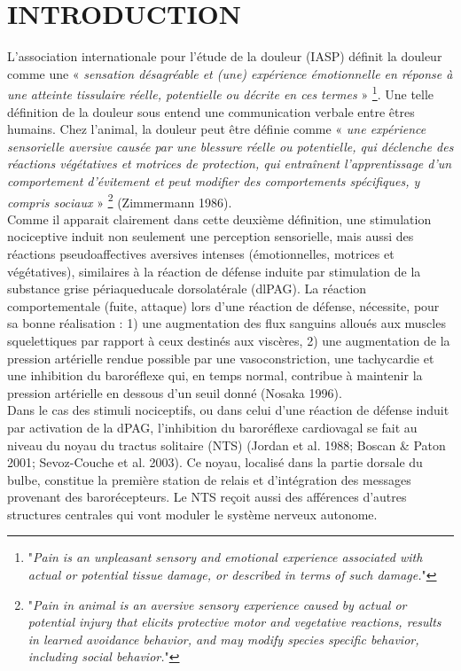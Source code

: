 \documentclass[a4paper,12pt,twoside]{report}
\begin{document}
\cleardoublepage

\setlength{\parindent}{1cm}

\section{INTRODUCTION}

L’association internationale pour l’étude de la douleur (IASP) définit la douleur comme une « \textit{sensation désagréable et (une) expérience émotionnelle en réponse à une atteinte tissulaire réelle, potentielle ou décrite en ces termes} »
\footnote{"\textit{Pain is an unpleasant sensory and emotional experience associated with actual or potential tissue damage, or described in terms of such damage.}"}. 
Une telle définition de la douleur sous entend une communication verbale entre êtres humains. Chez l’animal, la douleur peut être définie comme « \textit{une expérience sensorielle aversive causée par une blessure réelle ou potentielle, qui déclenche des réactions végétatives et motrices de protection, qui entraînent l’apprentissage d’un comportement d’évitement et peut modifier des comportements spécifiques, y compris sociaux} »
\footnote{"\textit{Pain in animal is an aversive sensory experience caused by actual or potential injury that elicits protective motor and vegetative reactions, results in learned avoidance behavior, and may modify species specific behavior, including social behavior.}"} 
(Zimmermann 1986).\\
Comme il apparait clairement dans cette deuxième définition, une stimulation nociceptive induit non seulement une perception sensorielle, mais aussi des réactions pseudoaffectives aversives intenses (émotionnelles, motrices et végétatives), similaires à la réaction de défense induite par stimulation de la substance grise périaqueducale dorsolatérale (dlPAG). La réaction comportementale (fuite, attaque) lors d’une réaction de défense, nécessite, pour sa bonne réalisation : 1) une augmentation des flux sanguins alloués aux muscles squelettiques par rapport à ceux destinés aux viscères, 2) une augmentation de la pression artérielle rendue possible par une vasoconstriction, une tachycardie et une inhibition du baroréflexe qui, en temps normal, contribue à maintenir la pression artérielle en dessous d’un seuil donné (Nosaka 1996).\\
Dans le cas des stimuli nociceptifs, ou dans celui d’une réaction de défense induit par activation de la dPAG, l’inhibition du baroréflexe cardiovagal se fait au niveau du noyau du tractus solitaire (NTS) (Jordan et al. 1988; Boscan \& Paton 2001; Sevoz-Couche et al. 2003). Ce noyau, localisé dans la partie dorsale du bulbe, constitue la première station de relais et d’intégration des messages provenant des barorécepteurs. Le NTS reçoit aussi des afférences d’autres structures centrales qui vont moduler le système nerveux autonome. 
\end{document}
